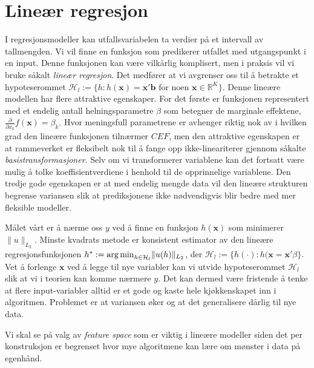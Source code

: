 \section{Lineær regresjon}
I regresjonsmodeller kan utfallsvariabelen ta verdier på et intervall av tallmengden. Vi vil finne en funksjon som predikerer utfallet med utgangspunkt i en input. Denne funksjonen kan være vilkårlig komplisert, men i praksis vil vi bruke såkalt \textit{lineær regresjon}. Det medfører at vi avgrenser oss til å betrakte et hypoteserommet $\mathcal{H}_l := \{h:h(\mathbf{x})=\mathbf{x}'\mathbf{b}\text{ for noen } \mathbf{x} \in \mathbb{R}^K\}$. Denne lineære modellen har flere attraktive egenskaper. For det første er funksjonen representert med et endelig antall helningsparametre $\beta$ som betegner de marginale effektene, $\frac{\partial}{\partial x_k} f(\mathbf{x})=\beta_k$. Hvor meningsfull parametrene er avhenger riktig nok av i hvilken grad den lineære funksjonen tilnærmer $CEF$, men den attraktive egenskapen er at rammeverket er fleksibelt nok til å fange opp ikke-lineariterer gjennom såkalte \textit{basistransformasjoner}. Selv om vi transformerer variablene kan det fortsatt være mulig å tolke koeffisientverdiene i henhold til de opprinnelige variablene. Den tredje gode egenskapen er at med endelig mengde data vil den lineære strukturen begrense variansen slik at prediksjonene ikke nødvendigvis blir bedre med mer fleksible modeller. 

Målet vårt er å nærme oss $y$ ved å finne en funksjon $h(\mathbf{x})$ som minimerer $\lVert u \rVert_{L_2}$. Minste kvadrats metode er konsistent estimator av den lineære regresjonsfunksjonen $h^* := \operatorname*{arg\,min}_{h \in \mathcal{H}_l}\lVert u(h) \rVert_{L_2}$, der $\mathcal{H}_l := \{h(\cdot): h(\mathbf{x}=\mathbf{x}'\beta\}$. Vet å forlenge $\mathbf{x}$ ved å legge til nye variabler kan vi utvide hypoteserommet $\mathcal{H}_l$ slik at vi i teorien kan komme nærmere $y$. Det kan dermed være fristende å tenke at flere input-variabler alltid er et gode og kaste hele kjøkkenskapet inn i algoritmen. Problemet er at variansen øker og at det generalisere dårlig til nye data. 

Vi skal se på valg av \textit{feature space} som er viktig i lineære modeller siden det per konstruksjon er begrenset hvor mye algoritmene kan lære om mønster i data på egenhånd. 
